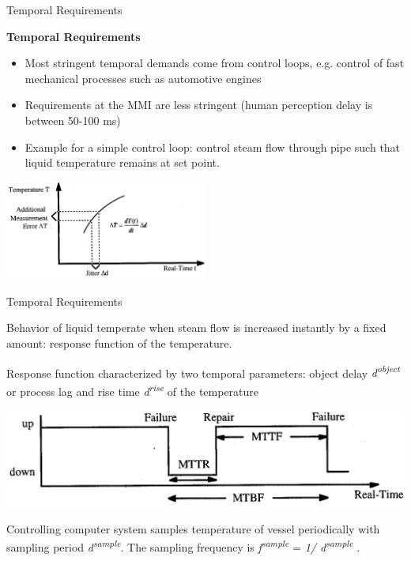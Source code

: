 \begin{frame}{Temporal Requirements}

\textbf{Temporal Requirements}

\begin{itemize}
\item
  Most stringent temporal demands come from control loops, e.g. control
  of fast mechanical processes such as automotive engines
\item
  Requirements at the MMI are less stringent (human perception delay is
  between 50-100 ms)
\item
  Example for a simple control loop: control steam flow through pipe
  such that liquid temperature remains at set point.
\end{itemize}

\includegraphics[width=0.5\textwidth]{media/Fig_1_6.png}

\end{frame}


\begin{frame}{Temporal Requirements}

Behavior of liquid temperate when steam flow is increased instantly by a
fixed amount: response function of the temperature.

Response function characterized by two temporal parameters: object delay
\emph{d\textsuperscript{object}} or process lag and rise time
\emph{d\textsuperscript{rise}} of the temperature

\includegraphics[width=\textwidth]{media/Fig_1_7.png}

Controlling computer system samples temperature of vessel periodically
with sampling period \emph{d\textsuperscript{sample}}. The sampling
frequency is \emph{f\textsuperscript{sample}} = \emph{1/
d\textsuperscript{sample}} .

\end{frame}

